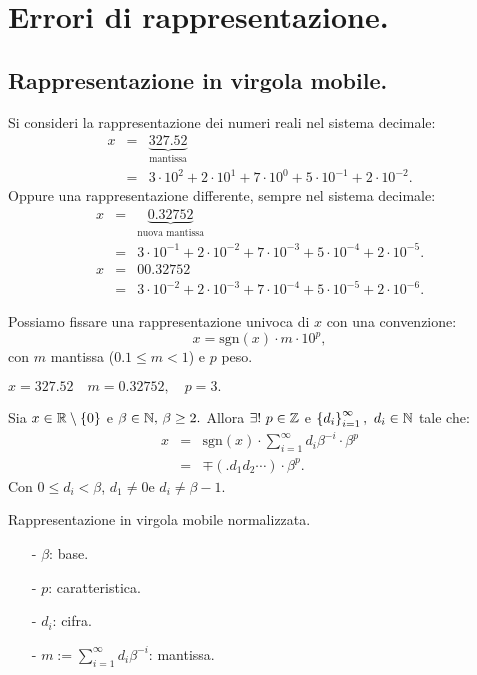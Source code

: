 \section{Errori di rappresentazione.}
\subsection{Rappresentazione in virgola mobile.}
Si consideri la rappresentazione dei numeri reali nel sistema decimale:
\[
\begin{array}{lcl}
x & = & \underbrace{327.52}_{\textrm{mantissa}}\\
  & = & 3\cdot 10^2 + 2\cdot 10^1 + 7\cdot 10^0 + 5\cdot 10^{-1} + 2\cdot 
10^{-2}.
\end{array}
\]
Oppure una rappresentazione differente, sempre nel sistema decimale:
\[
\begin{array}{lcl}
x & = & \underbrace{0.32752}_{\textrm{nuova mantissa}}\\
  & = & 3\cdot 10^{-1} + 2\cdot 10^{-2} + 7\cdot 10^{-3} + 5\cdot 10^{-4} + 2
\cdot 
10^{-5}.
\end{array}
\]
\[
\begin{array}{lcl}
x & = & 00.32752 \\
  & = & 3\cdot 10^{-2} + 2\cdot 10^{-3} + 7\cdot 10^{-4} + 5\cdot 10^{-5} + 2
\cdot 
10^{-6}.
\end{array}
\]

Possiamo fissare una rappresentazione univoca di $x$ con una convenzione:
\[x = \textrm{sgn}(x)\cdot m \cdot 10^p,\]
con $m$ mantissa ($0.1 \leq m < 1$) e $p$ peso.
\begin{exe}
$x = 327.52 \quad m = 0.32752, \quad p = 3.$
\end{exe}

\begin{teo}
Sia $x \in \mathbb{R}\setminus\{0\}$ e $\beta \in \mathbb{N}, \, \beta \geq 2.$ Allora
$\exists ! \ p \in \mathbb{Z}$ e $\left\{d_i\right\}_{i = 1}^{\infty}, \ d_i \in \mathbb{N}$
tale che:
\[
\begin{array}{lcl}
x & = & \mathrm{sgn}(x) \cdot \sum_{i = 1}^{\infty}d_i \beta^{-i} \cdot \beta^p \\
  & = & \mp(.d_1d_2\cdots)\cdot \beta^p.
\end{array}
\]
Con $ 0 \leq d_i < \beta$, $d_1 \neq 0$e $d_i \neq \beta -1$.
\end{teo}

\begin{defi}
Rappresentazione in virgola mobile normalizzata.
\begin{itemize}
\item[-]$\beta$: base.
\item[-]$p$: caratteristica.
\item[-]$d_i$: cifra.
\item[-]$m := \sum_{i = 1}^{\infty}d_i\beta^{-i}$: mantissa.
\end{itemize}
\end{defi}

